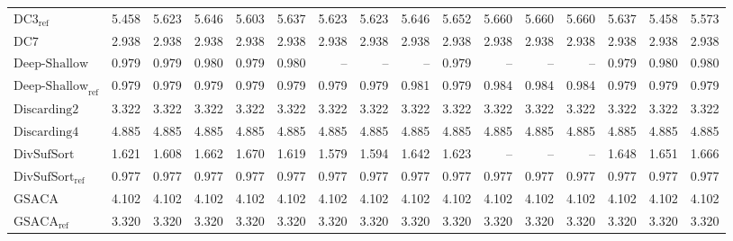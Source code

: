 \begin{table}
{\begin{tabular}{lrrrrrrrrrrrrrrr}
    $\text{DC3}_{\text{ref}}$ & {\color{red}5.458} & {\color{red}5.623} & {\color{red}5.646} & {\color{red}5.603} & {\color{red}5.637} & {\color{red}5.623} & {\color{red}5.623} & {\color{red}5.646} & {\color{red}5.652} & {\color{red}5.660} & {\color{red}5.660} & {\color{red}5.660} & {\color{red}5.637} & {\color{red}5.458} & {\color{red}5.573} \\
    $\text{DC7}$ & 2.938 & 2.938 & 2.938 & 2.938 & 2.938 & 2.938 & 2.938 & 2.938 & 2.938 & 2.938 & 2.938 & 2.938 & 2.938 & 2.938 & 2.938 \\
    $\text{Deep-Shallow}$ & 0.979 & 0.979 & 0.980 & 0.979 & 0.980 & {\color{darkgray}--} & {\color{darkgray}--} & {\color{darkgray}--} & 0.979 & {\color{darkgray}--} & {\color{darkgray}--} & {\color{darkgray}--} & 0.979 & 0.980 & 0.980 \\
    $\text{Deep-Shallow}_{\text{ref}}$ & 0.979 & 0.979 & 0.979 & 0.979 & 0.979 & 0.979 & 0.979 & 0.981 & 0.979 & 0.984 & 0.984 & 0.984 & 0.979 & 0.979 & 0.979 \\
    $\text{Discarding2}$ & 3.322 & 3.322 & 3.322 & 3.322 & 3.322 & 3.322 & 3.322 & 3.322 & 3.322 & 3.322 & 3.322 & 3.322 & 3.322 & 3.322 & 3.322 \\
    $\text{Discarding4}$ & {\color{red}4.885} & {\color{red}4.885} & {\color{red}4.885} & {\color{red}4.885} & {\color{red}4.885} & {\color{red}4.885} & {\color{red}4.885} & {\color{red}4.885} & {\color{red}4.885} & {\color{red}4.885} & {\color{red}4.885} & {\color{red}4.885} & {\color{red}4.885} & {\color{red}4.885} & {\color{red}4.885} \\
    $\text{DivSufSort}$ & 1.621 & 1.608 & 1.662 & 1.670 & 1.619 & 1.579 & 1.594 & 1.642 & 1.623 & {\color{darkgray}--} & {\color{darkgray}--} & {\color{darkgray}--} & 1.648 & 1.651 & 1.666 \\
    $\text{DivSufSort}_{\text{ref}}$ & 0.977 & 0.977 & {\color{green!60!black}0.977} & {\color{green!60!black}0.977} & {\color{green!60!black}0.977} & {\color{green!60!black}0.977} & {\color{green!60!black}0.977} & {\color{green!60!black}0.977} & {\color{green!60!black}0.977} & {\color{green!60!black}0.977} & {\color{green!60!black}0.977} & {\color{green!60!black}0.977} & {\color{green!60!black}0.977} & {\color{green!60!black}0.977} & {\color{green!60!black}0.977} \\
    $\text{GSACA}$ & 4.102 & 4.102 & 4.102 & 4.102 & 4.102 & 4.102 & 4.102 & 4.102 & 4.102 & 4.102 & 4.102 & 4.102 & 4.102 & 4.102 & 4.102 \\
    $\text{GSACA}_{\text{ref}}$ & 3.320 & 3.320 & 3.320 & 3.320 & 3.320 & 3.320 & 3.320 & 3.320 & 3.320 & 3.320 & 3.320 & 3.320 & 3.320 & 3.320 & 3.320 \\

\end{tabular}}
\end{table}
